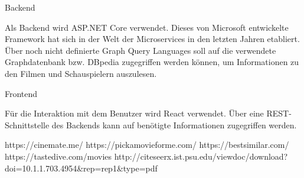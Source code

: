 \documentclass[conference]{IEEEtran}
\begin{document}
Backend

Als Backend wird ASP.NET Core verwendet. Dieses von Microsoft entwickelte Framework hat sich in der Welt der Microservices in den letzten Jahren etabliert. Über noch nicht definierte Graph Query Languages soll auf die verwendete Graphdatenbank bzw. DBpedia zugegriffen werden können, um Informationen zu den Filmen und Schauspielern auszulesen.

Frontend

Für die Interaktion mit dem Benutzer wird React verwendet. Über eine REST-Schnittstelle des Backends kann auf benötigte Informationen zugegriffen werden.


\begin{thebibliography}{0}
	https://cinemate.me/
	https://pickamovieforme.com/
	https://bestsimilar.com/
	https://tastedive.com/movies
	http://citeseerx.ist.psu.edu/viewdoc/download?doi=10.1.1.703.4954\&rep=rep1\&type=pdf
\end{thebibliography}
\vspace{12pt}
\end{document}
